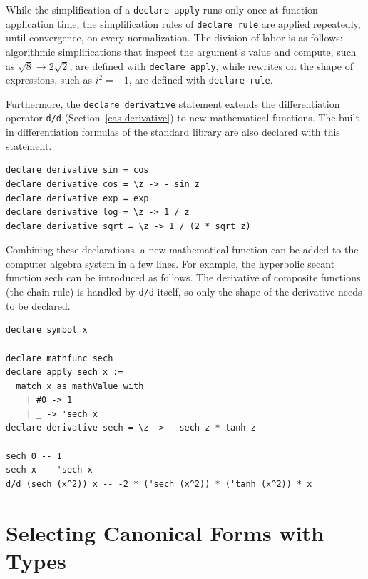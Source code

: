 While the simplification of a \lstinline{declare apply} runs only once at function application time, the simplification rules of \lstinline{declare rule} are applied repeatedly, until convergence, on every normalization.
The division of labor is as follows: algorithmic simplifications that inspect the argument's value and compute, such as $\sqrt{8} \rightarrow 2\sqrt{2}$, are defined with \lstinline{declare apply}, while rewrites on the shape of expressions, such as $i^2 = -1$, are defined with \lstinline{declare rule}.

Furthermore, the \lstinline{declare derivative} statement extends the differentiation operator \lstinline{d/d} (Section~\ref{cas-derivative}) to new mathematical functions.
The built-in differentiation formulas of the standard library are also declared with this statement.
\begin{lstlisting}[language=egison,numbers=none]
declare derivative sin = cos
declare derivative cos = \z -> - sin z
declare derivative exp = exp
declare derivative log = \z -> 1 / z
declare derivative sqrt = \z -> 1 / (2 * sqrt z)
\end{lstlisting}

Combining these declarations, a new mathematical function can be added to the computer algebra system in a few lines.
For example, the hyperbolic secant function $\mathrm{sech}$ can be introduced as follows.
The derivative of composite functions (the chain rule) is handled by \lstinline{d/d} itself, so only the shape of the derivative needs to be declared.
\begin{lstlisting}[language=egison,numbers=none]
declare symbol x

declare mathfunc sech
declare apply sech x :=
  match x as mathValue with
    | #0 -> 1
    | _ -> 'sech x
declare derivative sech = \z -> - sech z * tanh z

sech 0 -- 1
sech x -- 'sech x
d/d (sech (x^2)) x -- -2 * ('sech (x^2)) * ('tanh (x^2)) * x
\end{lstlisting}

\section{Selecting Canonical Forms with Types}\label{cas-tower}

